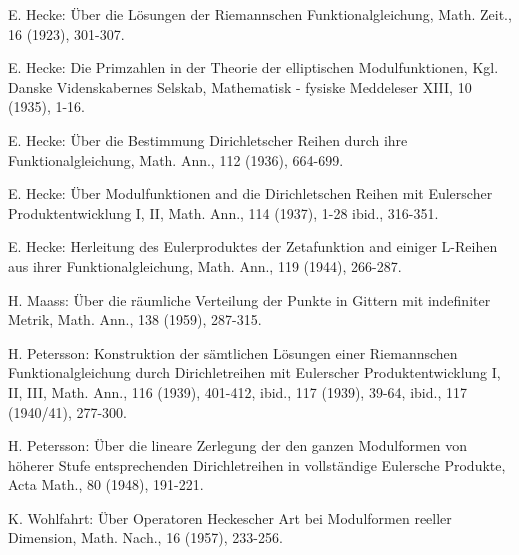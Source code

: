 \begin{thebibliography}{99}
 E. Hecke: \"Uber die L\"osungen der Riemannschen
  Funktionalgleichung, Math. Zeit., 16 (1923), 301-307.

 E. Hecke: Die Primzahlen in der Theorie der
  elliptischen Modulfunktionen, Kgl. Danske Videnskabernes Selskab,
  Mathematisk - fysiske Meddeleser XIII, 10 (1935), 1-16.

 E. Hecke: \"Uber die Bestimmung Dirichletscher Reihen
  durch ihre Funktionalgleichung, Math. Ann., 112 (1936), 664-699.

 E. Hecke: \"Uber Modulfunktionen and die Dirichletschen
  Reihen mit Eulerscher Produktentwicklung I, II, Math. Ann., 114
  (1937), 1-28 ibid., 316-351.

 E. Hecke: Herleitung des Eulerproduktes der
  Zetafunktion and einiger L-Reihen aus ihrer Funktionalgleichung,
  Math. Ann., 119 (1944), 266-287.

 H. Maass: \pageoriginale \"Uber die r\"aumliche
  Verteilung der Punkte in Gittern mit indefiniter Metrik, Math. Ann.,
  138 (1959), 287-315. 

 H. Petersson: Konstruktion der s\"amtlichen L\"osungen
  einer Riemannschen Funktionalgleichung durch Dirichletreihen mit
  Eulerscher Produktentwicklung I, II, III, Math. Ann., 116 (1939),
  401-412, ibid., 117 (1939), 39-64, ibid., 117 (1940/41), 277-300.

 H. Petersson: \"Uber die lineare Zerlegung der den
  ganzen Modulformen von h\"oherer Stufe entsprechenden
  Dirichletreihen in vollst\"andige Eulersche Produkte, Acta Math., 80
  (1948), 191-221.

 K. Wohlfahrt: \"Uber Operatoren Heckescher Art bei
  Modulformen reeller Dimension, Math. Nach., 16 (1957), 233-256.
\end{thebibliography}
